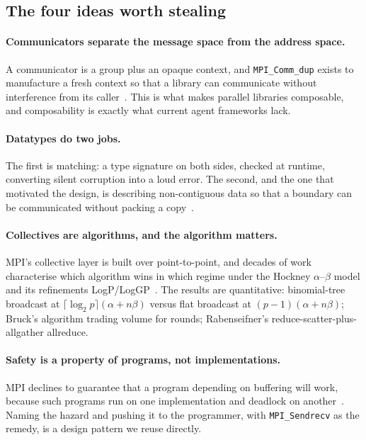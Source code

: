 \documentclass[10pt,twocolumn]{article}
\theoremstyle{definition}
\theoremstyle{plain}
\newcommand{\code}[1]{\texttt{\small #1}}
\begin{document}
\subsection{The four ideas worth stealing}

\paragraph{Communicators separate the message space from the address space.}
A communicator is a group plus an opaque context, and \code{MPI\_Comm\_dup} exists
to manufacture a fresh context so that a library can communicate without
interference from its caller~\cite{mpiforum94,gropp99}. This is what makes
parallel libraries composable, and composability is exactly what current agent
frameworks lack.

\paragraph{Datatypes do two jobs.} The first is matching: a type signature on both
sides, checked at runtime, converting silent corruption into a loud error. The
second, and the one that motivated the design, is describing non-contiguous data
so that a boundary can be communicated without packing a
copy~\cite{MPI-datatypes,Traff99,Reussner00}.

\paragraph{Collectives are algorithms, and the algorithm matters.} MPI's
collective layer is built over point-to-point, and decades of work
characterise which algorithm wins in which regime under the Hockney
$\alpha$--$\beta$ model and its refinements
LogP/LogGP~\cite{Hockney94,Culler93,Alexandrov97,ThakurRabenseifnerGropp05,Rabenseifner04,Bruck97,Chan07,Sanders09}.
The results are quantitative: binomial-tree broadcast at
$\lceil\log_2 p\rceil(\alpha+n\beta)$ versus flat broadcast at
$(p-1)(\alpha+n\beta)$; Bruck's algorithm trading volume for rounds; Rabenseifner's
reduce-scatter-plus-allgather allreduce.

\paragraph{Safety is a property of programs, not implementations.} MPI declines to
guarantee that a program depending on buffering will work, because such programs
run on one implementation and deadlock on another~\cite{snir96-buffering}. Naming
the hazard and pushing it to the programmer, with \code{MPI\_Sendrecv} as the
remedy, is a design pattern we reuse directly.
\end{document}
